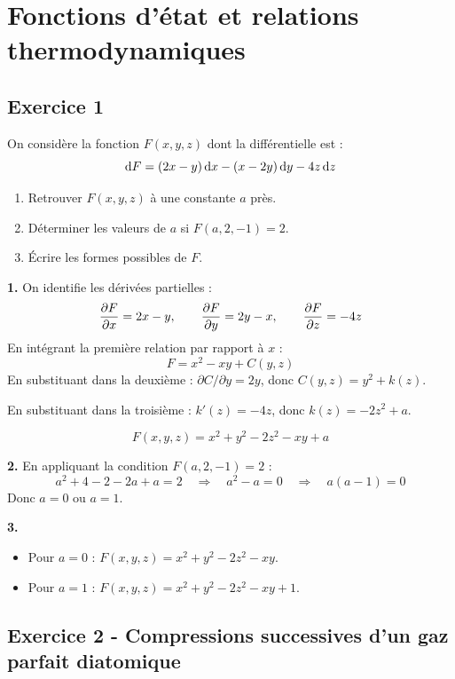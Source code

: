 \documentclass[12pt,a4paper]{article}
\begin{document}
\newpage

\section{Fonctions d'état et relations thermodynamiques}

\subsection*{Exercice 1 \niveau{\moyen}}

\begin{boiteexercice}
On considère la fonction $F(x,y,z)$ dont la différentielle est :
\[
\mathrm{d} F = (2x-y)\,\mathrm{d} x - (x-2y)\,\mathrm{d} y - 4z\,\mathrm{d} z
\]
\begin{enumerate}
  \item Retrouver $F(x,y,z)$ à une constante $a$ près.
  \item Déterminer les valeurs de $a$ si $F(a,2,-1) = 2$.
  \item Écrire les formes possibles de $F$.
\end{enumerate}
\end{boiteexercice}

\begin{boitecorrige}
\textbf{1.} On identifie les dérivées partielles :
\[
\dfrac{\partial F}{\partial x} = 2x-y, \qquad \dfrac{\partial F}{\partial y} = 2y-x, \qquad \dfrac{\partial F}{\partial z} = -4z
\]
En intégrant la première relation par rapport à $x$ :
\[
F = x^2 - xy + C(y,z)
\]
En substituant dans la deuxième : $\partial C/\partial y = 2y$, donc $C(y,z) = y^2 + k(z)$.

En substituant dans la troisième : $k'(z) = -4z$, donc $k(z) = -2z^2 + a$.

\[
\boxed{F(x,y,z) = x^2 + y^2 - 2z^2 - xy + a}
\]

\textbf{2.} En appliquant la condition $F(a,2,-1) = 2$ :
\[
a^2 + 4 - 2 - 2a + a = 2 \quad \Rightarrow \quad a^2 - a = 0 \quad \Rightarrow \quad a(a-1) = 0
\]
Donc $a = 0$ ou $a = 1$.

\textbf{3.}
\begin{itemize}
  \item Pour $a=0$ : $F(x,y,z) = x^2 + y^2 - 2z^2 - xy$.
  \item Pour $a=1$ : $F(x,y,z) = x^2 + y^2 - 2z^2 - xy + 1$.
\end{itemize}
\end{boitecorrige}

\subsection*{Exercice 2 - Compressions successives d'un gaz parfait diatomique \niveau{\difficile}}
\end{document}

